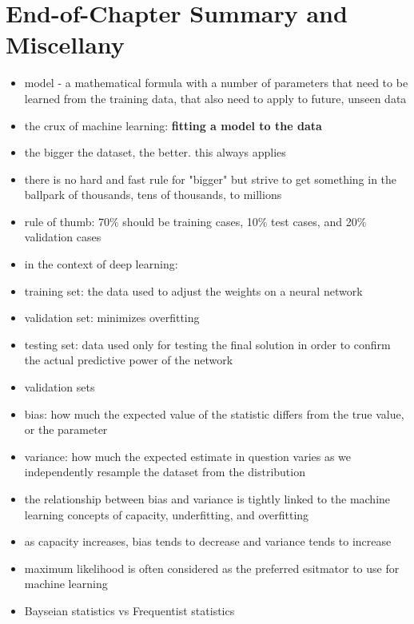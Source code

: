 \documentclass[11pt, twocolumn]{report}
\begin{document}
\section{End-of-Chapter Summary and Miscellany}
\begin{itemize}
  \item model - a mathematical formula with a number of parameters that need to
    be learned from the training data, that also need to apply to future,
    unseen data
  \item the crux of machine learning: \textbf{fitting a model to the data}
  \item the bigger the dataset, the better. this always applies
  \item there is no hard and fast rule for "bigger" but strive to get something
    in the ballpark of thousands, tens of thousands, to millions
  \item rule of thumb: 70\% should be training cases, 10\% test cases, and 20\%
    validation cases
  \item in the context of deep learning:
  \item training set: the data used to adjust the weights on a neural network
  \item validation set: minimizes overfitting
  \item testing set: data used only for testing the final solution in order to
    confirm the actual predictive power of the network
  \item validation sets
  \item bias: how much the expected value of the statistic differs from the
    true value, or the parameter
  \item variance: how much the expected estimate in question varies as
    we independently resample the dataset from the distribution
  \item the relationship between bias and variance is tightly linked to the
    machine learning concepts of capacity, underfitting, and overfitting
  \item as capacity increases, bias tends to decrease and variance tends to
    increase
  \item maximum likelihood is often considered as the preferred esitmator to
    use for machine learning
  \item Bayseian statistics vs Frequentist statistics
\end{itemize}
\end{document}
